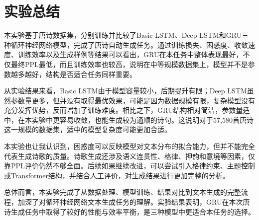 \documentclass[12pt,a4paper]{article}
\begin{document}
\section{实验总结}

本实验基于唐诗数据集，分别训练并比较了Basic LSTM、Deep LSTM和GRU三种循环神经网络模型，完成了唐诗自动生成任务。通过训练损失、困惑度、收敛速度、训练效率以及生成样例等结果可以看出，GRU在本任务中整体表现最好，不仅最终PPL最低，而且训练效率也较高，说明在中等规模数据集上，模型并不是参数越多越好，结构是否适合任务同样重要。

从实验结果来看，Basic LSTM由于模型容量较小，后期提升有限；Deep LSTM虽然参数量更多，但并没有取得最优效果，可能是因为数据规模有限，复杂模型没有充分发挥优势，反而增加了训练难度。相比之下，GRU结构相对简洁，参数量适中，在本实验中更容易收敛，也能生成较为通顺的诗句。这说明对于57,580首唐诗这一规模的数据集，适中的模型复杂度可能更加合适。

本实验也让我认识到，困惑度可以反映模型对文本分布的拟合能力，但并不能完全代表生成诗歌的质量。诗歌生成还涉及语义连贯性、格律、押韵和意境等因素，仅靠PPL评价仍然不够全面。后续如果继续改进，可以尝试引入格律约束、主题控制或Transformer结构，并结合人工评价，对生成结果进行更加完整的分析。

总体而言，本实验完成了从数据处理、模型训练、结果对比到文本生成的完整流程，加深了对循环神经网络文本生成任务的理解。实验结果表明，GRU在本次唐诗生成任务中取得了较好的性能与效率平衡，是三种模型中更适合本任务的选择。




\end{document}
